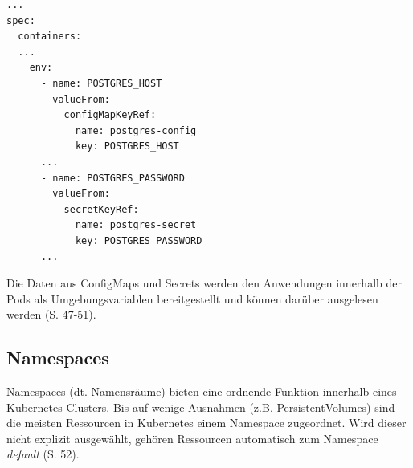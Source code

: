 \documentclass[11pt,a4paper]{article}
\begin{document}

\begin{lstlisting}[caption={Referenzen zur ConfigMaps und Secrets können in einem Deployment unter dem Schlüssel \emph{env} definiert werden \cite{Schmeling_Dargatz_2022} (S. 50).}, label={lst:deploy-with-conf}]
...
spec:
  containers:
  ...
    env:
      - name: POSTGRES_HOST
        valueFrom:
          configMapKeyRef:
            name: postgres-config
            key: POSTGRES_HOST
      ...
      - name: POSTGRES_PASSWORD
        valueFrom:
          secretKeyRef:
            name: postgres-secret
            key: POSTGRES_PASSWORD
      ...
\end{lstlisting}

Die Daten aus ConfigMaps und Secrets werden den Anwendungen innerhalb der Pods als Umgebungsvariablen
bereitgestellt und können darüber ausgelesen werden \cite{Schmeling_Dargatz_2022} (S. 47-51).

\subsection{Namespaces}
Namespaces (dt. Namensräume) bieten eine ordnende Funktion innerhalb eines Kubernetes-Clusters.
Bis auf wenige Ausnahmen (z.B. PersistentVolumes) sind die meisten Ressourcen in Kubernetes einem
Namespace zugeordnet. Wird dieser nicht explizit ausgewählt, gehören Ressourcen automatisch zum
Namespace \emph{default} \cite{Schmeling_Dargatz_2022} (S. 52).
\end{document}
